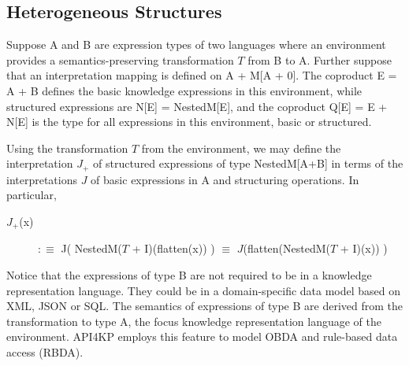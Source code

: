 \documentclass[runningheads]{llncs}
\begin{document}

\vspace{-0.3cm}
\subsection{Heterogeneous Structures}
Suppose A and B are expression types of two languages where an environment provides a semantics-preserving transformation $T$ from B to A.
Further suppose that an interpretation mapping  is defined on A + M[A + 0].
The coproduct E = A + B defines the basic knowledge expressions in this environment, while structured expressions are N[E] = NestedM[E], and
the coproduct Q[E] = E + N[E] is the type for all expressions in this environment, basic or structured. 

Using the transformation $T$ from the environment, we may define the interpretation $J_{+}$ of structured expressions of type NestedM[A+B] in terms of the interpretations $J$ of basic expressions in A and structuring operations. In particular,
\begin{description}
\item[$J_{+}$(x)] $:\equiv$ J( NestedM($T$ + I)(flatten(x)) ) $\equiv$ $J$(flatten(NestedM($T$ + I)(x)) )
\end{description}
Notice that the expressions of type B are not required to be in a knowledge representation language. They could be in a domain-specific data model based on XML, JSON or SQL. The semantics of expressions of type B are derived from the transformation to type A, the focus  knowledge representation language of the environment. API4KP employs this feature to model OBDA and rule-based data access (RBDA).
\end{document}
